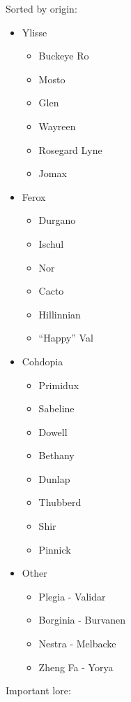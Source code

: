 Sorted by origin:\\
\begin{minipage}[l]{0.5\textwidth}
\begin{itemize}
\item Ylisse
\begin{itemize}
\item Buckeye Ro
\item Mosto
\item Glen
\item Wayreen
\item Rosegard Lyne
\item Jomax
\end{itemize}
\item Ferox
\begin{itemize}
\item Durgano
\item Ischul
\item Nor
\item Cacto
\item Hillinnian
\item ``Happy'' Val
\end{itemize}
\end{itemize}
\end{minipage}
\begin{minipage}[r]{0.5\textwidth}
\begin{itemize}
\item Cohdopia
\begin{itemize}
\item Primidux
\item Sabeline
\item Dowell
\item Bethany
\item Dunlap
\item Thubberd
\item Shir
\item Pinnick
\end{itemize}
\item Other
\begin{itemize}
\item Plegia - Validar
\item Borginia - Burvanen
\item Nestra - Melbacke
\item Zheng Fa - Yorya
\end{itemize}
\end{itemize}
\end{minipage}
Important lore:
